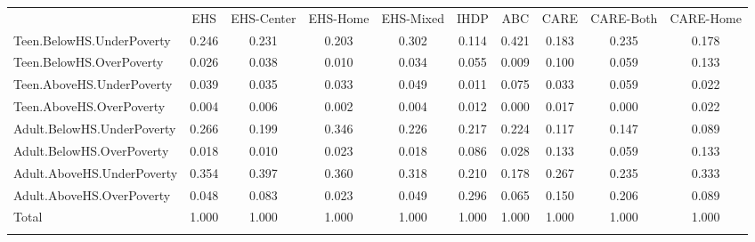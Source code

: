 \begin{tabular}{lccccccccc}
\hline \noalign{\smallskip} & EHS & EHS-Center & EHS-Home & EHS-Mixed & IHDP & ABC & CARE & CARE-Both & CARE-Home\\
\noalign{\smallskip}\hline \noalign{\smallskip}Teen.BelowHS.UnderPoverty & 0.246 & 0.231 & 0.203 & 0.302 & 0.114 & 0.421 & 0.183 & 0.235 & 0.178\\
Teen.BelowHS.OverPoverty & 0.026 & 0.038 & 0.010 & 0.034 & 0.055 & 0.009 & 0.100 & 0.059 & 0.133\\
Teen.AboveHS.UnderPoverty & 0.039 & 0.035 & 0.033 & 0.049 & 0.011 & 0.075 & 0.033 & 0.059 & 0.022\\
Teen.AboveHS.OverPoverty & 0.004 & 0.006 & 0.002 & 0.004 & 0.012 & 0.000 & 0.017 & 0.000 & 0.022\\
Adult.BelowHS.UnderPoverty & 0.266 & 0.199 & 0.346 & 0.226 & 0.217 & 0.224 & 0.117 & 0.147 & 0.089\\
Adult.BelowHS.OverPoverty & 0.018 & 0.010 & 0.023 & 0.018 & 0.086 & 0.028 & 0.133 & 0.059 & 0.133\\
Adult.AboveHS.UnderPoverty & 0.354 & 0.397 & 0.360 & 0.318 & 0.210 & 0.178 & 0.267 & 0.235 & 0.333\\
Adult.AboveHS.OverPoverty & 0.048 & 0.083 & 0.023 & 0.049 & 0.296 & 0.065 & 0.150 & 0.206 & 0.089\\
Total & 1.000 & 1.000 & 1.000 & 1.000 & 1.000 & 1.000 & 1.000 & 1.000 & 1.000\\
\noalign{\smallskip}\hline\end{tabular}\\
